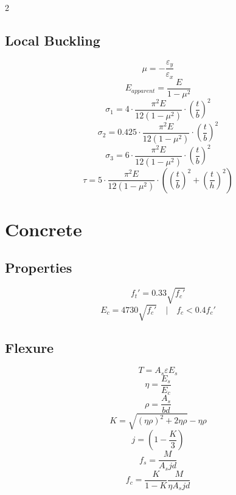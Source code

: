 \documentclass[14pt]{article}
\begin{document}
\begin{multicols}{2}
    \subsection{Local Buckling}
    \begin{equation}
        \mu=-\frac{\varepsilon_y}{\varepsilon_x}
    \end{equation}
    \begin{equation}
        E_{apparent}=\frac{E}{1-\mu^2}
    \end{equation}
    \begin{equation}
        \sigma_{1}=4\cdot \frac{\pi^2 E}{12(1-\mu^2)}\cdot\left(\frac{t}{b}\right)^2
    \end{equation}
    \begin{equation}
        \sigma_{2}=0.425\cdot \frac{\pi^2 E}{12(1-\mu^2)}\cdot\left(\frac{t}{b}\right)^2
    \end{equation}
    \begin{equation}
        \sigma_{3}=6\cdot \frac{\pi^2 E}{12(1-\mu^2)}\cdot\left(\frac{t}{b}\right)^2
    \end{equation}
    \begin{equation}
        \tau=5\cdot \frac{\pi^2 E}{12(1-\mu^2)}\cdot\left(\left(\frac{t}{b}\right)^2+\left(\frac{t}{h}\right)^2\right)
    \end{equation}
    \pagebreak
    \section{Concrete}
    \subsection{Properties}
    \begin{equation}
        f_t'=0.33\sqrt{f_c'}
    \end{equation}
    \begin{equation}
        E_c=4730\sqrt{f_c'} \quad | \quad f_c<0.4f_c'
    \end{equation}
    \subsection{Flexure}
    \begin{equation}
        T=A_s \varepsilon E_s
    \end{equation}
    \begin{equation}
        \eta=\frac{E_s}{E_c}
    \end{equation}
    \begin{equation}
        \rho = \frac{A_s}{bd}
    \end{equation}
    \begin{equation}
        K=\sqrt{(\eta \rho)^2 +2 \eta \rho}-\eta \rho
    \end{equation}
    \begin{equation}
        j=(1-\frac{K}{3})
    \end{equation}
    \begin{equation}
        f_s=\frac{M}{A_sjd}
    \end{equation}
    \begin{equation}
        f_c=\frac{K}{1-K}\frac{M}{\eta A_s jd}
    \end{equation}

\end{multicols}
\end{document}
